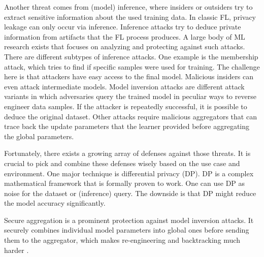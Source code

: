 Another threat comes from (model) inference, where insiders or outsiders try to extract sensitive information about the used training data.
In classic FL, privacy leakage can only occur via inference.
Inference attacks try to deduce private information from artifacts that the FL process produces.
A large body of ML research exists that focuses on analyzing and protecting against such attacks.
There are different subtypes of inference attacks.
One example is the membership attack, which tries to find if specific samples were used for training.
The challenge here is that attackers have easy access to the final model.
Malicious insiders can even attack intermediate models.
Model inversion attacks are different attack variants in which adversaries query the trained model in peculiar ways to reverse engineer data samples. 
If the attacker is repeatedly successful, it is possible to deduce the original dataset.
Other attacks require malicious aggregators that can trace back the update parameters that the learner provided before aggregating the global parameters. \cite{book:fl}

Fortunately, there exists a growing array of defenses against those threats.
It is crucial to pick and combine these defenses wisely based on the use case and environment.
One major technique is differential privacy (DP).
DP is a complex mathematical framework that is formally proven to work.
One can use DP as noise for the dataset or (inference) query.
The downside is that DP might reduce the model accuracy significantly. \cite{book:fl}

Secure aggregation is a prominent protection against model inversion attacks.
It securely combines individual model parameters into global ones before sending them to the aggregator, which makes re-engineering and backtracking much harder \cite{paper:cluster_based_secure_aggregation_for_fl}. 